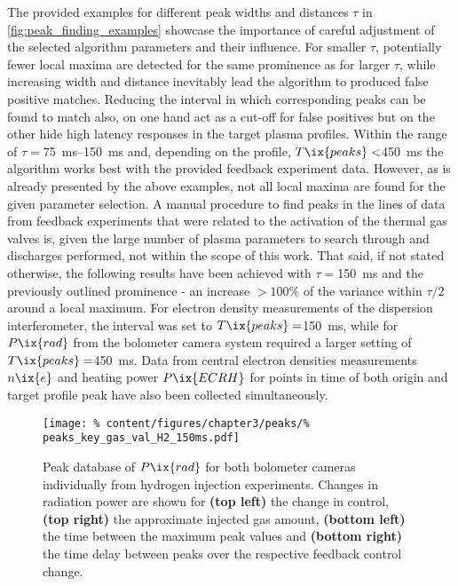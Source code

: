         The provided examples for different peak widths and distances $\tau$ in \cref{fig:peak_finding_examples} showcase the importance of careful adjustment of the selected algorithm parameters and their influence. For smaller $\tau$, potentially fewer local maxima are detected for the same prominence as for larger $\tau$, while increasing width and distance inevitably lead the algorithm to produced false positive matches. Reducing the interval in which corresponding peaks can be found to match also, on one hand act as a cut-off for false positives but on the other hide high latency responses in the target plasma profiles. Within the range of $\tau=$\SIrange{75}{150}{\milli\second} and, depending on the profile, $T\ix{peaks}<$\SI{450}{\milli\second} the algorithm works best with the provided feedback experiment data. However, as is already presented by the above examples, not all local maxima are found for the given parameter selection. A manual procedure to find peaks in the lines of data from feedback experiments that were related to the activation of the thermal gas valves is, given the large number of plasma parameters to search through and discharges performed, not within the scope of this work. That said, if not stated otherwise, the following results have been achieved with $\tau=$\SI{150}{\milli\second} and the previously outlined prominence - an increase $>100\%$ of the variance within $\tau/2$ around a local maximum. For electron density measurements of the dispersion interferometer, the interval was set to $T\ix{peaks}=$\SI{150}{\milli\second}, while for $P\ix{rad}$ from the bolometer camera system required a larger setting of $T\ix{peaks}=$\SI{450}{\milli\second}. Data from central electron densities measurements $n\ix{e}$ and heating power $P\ix{ECRH}$ for points in time of both origin and target profile peak have also been collected simultaneously.\\%
%
        \begin{figure}[t]%
            \centering%
            \texttt{[image: \%
                content/figures/chapter3/peaks/\%
                peaks\_key\_gas\_val\_H2\_150ms.pdf]}%
            \caption{Peak database of $P\ix{rad}$ for both bolometer cameras individually from hydrogen injection experiments. Changes in radiation power are shown for \textbf{(top left)} the change in control, \textbf{(top right)} the approximate injected gas amount, \textbf{(bottom left)} the time between the maximum peak values and \textbf{(bottom right)} the time delay between peaks over the respective feedback control change.}\label{fig:peak_database_H2}%
        \end{figure}%
